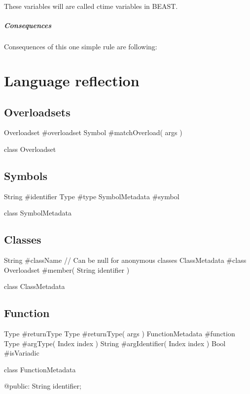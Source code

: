 These variables will are called ctime variables in BEAST.

\paragraph{Consequences} Consequences of this one simple rule are following:

\chapter{Language reflection}

\section{Overloadsets}
\begin{code}
Overloadset #overloadset
Symbol #matchOverload( args )

class Overloadset {
}
\end{code}

\section{Symbols}
\begin{code}
String #identifier
Type #type
SymbolMetadata #symbol

class SymbolMetadata {

}
\end{code}

\section{Classes}
\begin{code}
String #className // Can be null for anonymous classes
ClassMetadata #class
Overloadset #member( String identifier )

class ClassMetadata {
}
\end{code}

\section{Function}
\begin{code}
Type #returnType
Type #returnType( args )
FunctionMetadata #function
Type #argType( Index index )
String #argIdentifier( Index index )
Bool #isVariadic

class FunctionMetadata {
	
@public:
	String identifier;
	
	
}
\end{code}

